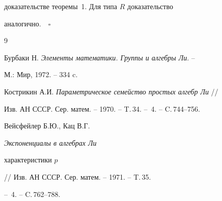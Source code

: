 доказательстве теоремы~1. Для типа $R$ доказательство


аналогично.$\quad\square$








\begin{thebibliography}{9}







Бурбаки Н. {\em Элементы математики. Группы и алгебры Ли}. --


М.: Мир, 1972. -- 334 c.




Кострикин А.И. {\em Параметрическое семейство простых алгебр Ли} //


Изв. АН СССР. Сер. матем. -- 1970. -- T.\,34. -- \No\,4. -- C.\,744--756.




Вейсфейлер Б.Ю., Кац В.Г. {\em Экспоненциалы в алгебрах Ли


характеристики $p$} // Изв. АН СССР. Сер. матем. -- 1971. -- T.\,35.


-- \No\,4. -- C.\,762--788.





\end{thebibliography}





\vskip 2cm












\label{end}






